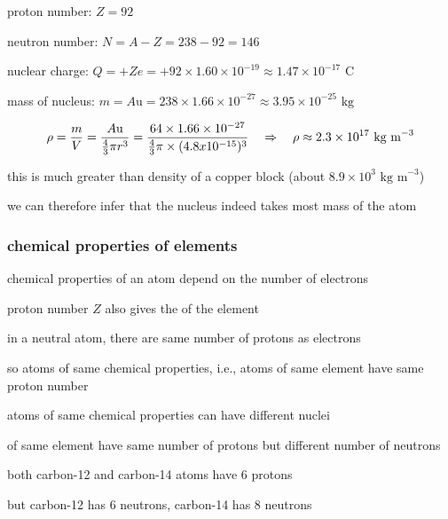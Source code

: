 \sol proton number: $Z=92$

neutron number: $N=A-Z=238-92=146$

nuclear charge: $Q=+Ze=+92\times1.60\times10^{-19}\approx1.47\times10^{-17}\text{ C}$

mass of nucleus: $m=A\text{u} = 238 \times 1.66\times10^{-27} \approx 3.95 \times 10^{-25}\text{ kg}$ \eoe



\solc\begin{equation*}
	\rho = \frac{m}{V} = \frac{A\text{u}}{\frac{4}{3}\pi r^3} = \frac{64 \times 1.66\times10^{-27}}{\frac{4}{3}\pi \times (4.8x10^{-15})^3} \quad \Rightarrow \quad \rho \approx 2.3 \times 10^{17} \text{ kg m}^{-3}
\end{equation*}

this is much greater than density of a copper block (about $8.9 \times  10^3 \text{ kg m}^{-3}$)

we can therefore infer that the nucleus indeed takes most mass of the atom \eoe


\subsubsection{chemical properties of elements}

chemical properties of an atom depend on the number of electrons

\cmt proton number $Z$ also gives the  of the element

in a neutral atom, there are same number of protons as electrons

so atoms of same chemical properties, i.e., atoms of same element have same proton number

\cmt atoms of same chemical properties can have different nuclei

 of same element have same number of protons but different number of neutrons






\sol both carbon-12 and carbon-14 atoms have 6 protons

but carbon-12 has 6 neutrons, carbon-14 has 8 neutrons

